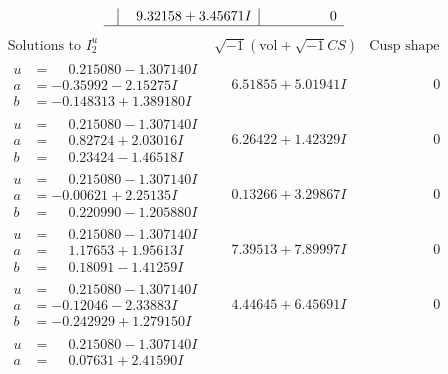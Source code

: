 \documentclass[1p]{elsarticle_modified}
\theoremstyle{definition}
\newcommand{\I}{\sqrt{-1}}
\begin{document}
$$\begin{array}{c|c|c}
 & \phantom{-}9.32158 + 3.45671 I & \phantom{-0.000000 } 0\\
 \hline 
 \end{array}$$\newpage$$\begin{array}{c|c|c}  
\text{Solutions to }I^u_{2}& \I (\text{vol} + \sqrt{-1}CS) & \text{Cusp shape}\\
 \hline 
\begin{aligned}
u &= \phantom{-}0.215080 - 1.307140 I \\
a &= -0.35992 - 2.15275 I \\
b &= -0.148313 + 1.389180 I\end{aligned}
 & \phantom{-}6.51855 + 5.01941 I & \phantom{-0.000000 } 0 \\ \hline\begin{aligned}
u &= \phantom{-}0.215080 - 1.307140 I \\
a &= \phantom{-}0.82724 + 2.03016 I \\
b &= \phantom{-}0.23424 - 1.46518 I\end{aligned}
 & \phantom{-}6.26422 + 1.42329 I & \phantom{-0.000000 } 0 \\ \hline\begin{aligned}
u &= \phantom{-}0.215080 - 1.307140 I \\
a &= -0.00621 + 2.25135 I \\
b &= \phantom{-}0.220990 - 1.205880 I\end{aligned}
 & \phantom{-}0.13266 + 3.29867 I & \phantom{-0.000000 } 0 \\ \hline\begin{aligned}
u &= \phantom{-}0.215080 - 1.307140 I \\
a &= \phantom{-}1.17653 + 1.95613 I \\
b &= \phantom{-}0.18091 - 1.41259 I\end{aligned}
 & \phantom{-}7.39513 + 7.89997 I & \phantom{-0.000000 } 0 \\ \hline\begin{aligned}
u &= \phantom{-}0.215080 - 1.307140 I \\
a &= -0.12046 - 2.33883 I \\
b &= -0.242929 + 1.279150 I\end{aligned}
 & \phantom{-}4.44645 + 6.45691 I & \phantom{-0.000000 } 0 \\ \hline\begin{aligned}
u &= \phantom{-}0.215080 - 1.307140 I \\
a &= \phantom{-}0.07631 + 2.41590 I \\

\end{aligned}
\end{array}$$
\end{document}
